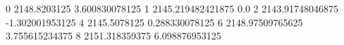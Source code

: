 0 2148.8203125 3.600830078125
1 2145.219482421875 0.0
2 2143.91748046875 -1.302001953125
4 2145.5078125 0.288330078125
6 2148.97509765625 3.755615234375
8 2151.318359375 6.098876953125
